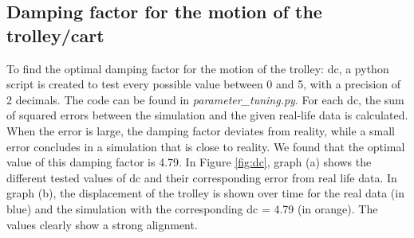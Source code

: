 \documentclass{article}
\begin{document}
\subsection{Damping factor for the motion of the trolley/cart}

To find the optimal damping factor for the motion of the trolley: dc, a python script is created to test every possible value between 0 and 5, with a precision of 2 decimals. The code can be found in \textit{parameter\_tuning.py}. For each dc, the sum of squared errors between the simulation and the given real-life data is calculated. When the error is large, the damping factor deviates from reality, while a small error concludes in a simulation that is close to reality. We found that the optimal value of this damping factor is 4.79. In Figure \ref{fig:dc}, graph (a) shows the different tested values of dc and their corresponding error from real life data. In graph (b), the displacement of the trolley is shown over time for the real data (in blue) and the simulation with the corresponding dc = 4.79 (in orange). The values clearly show a strong alignment.
\end{document}
